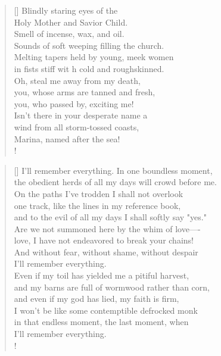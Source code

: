 \documentclass[]{article}
\begin{document}
\settowidth{\versewidth}{Blindly staring eyes of the        }
\begin{verse}[\versewidth]
Blindly staring eyes of the\\
Holy Mother and Savior Child.\\
Smell of incense, wax, and oil.\\
Sounds of soft weeping filling the church.\\
Melting tapers held by young, meek women\\
in fists stiff wit h cold and roughskinned.\\
Oh, steal me away from my death,\\
you, whose arms are tanned and fresh,\\
you, who passed by, exciting me!\\
Isn't there in your desperate name a\\
wind from all storm-tossed coasts,\\
Marina, named after the sea!\\!
\end{verse}
\newpage

\vspace*{0.05\textheight}
\settowidth{\versewidth}{I'll remember everything. In one boundless moment,    }
\begin{verse}[\versewidth]
I'll remember everything. In one boundless moment,\\
the obedient herds of all my days will crowd before me.\\
On the paths I've trodden I shall not overlook\\
one track, like the lines in my reference book,\\
and to the evil of all my days I shall softly say "yes."\\
Are we not summoned here by the whim of love—- \\
love, I have not endeavored to break your chains!\\
And without fear, without shame, without despair\\
I'll remember everything.\\
Even if my toil has yielded me a pitiful harvest,\\
and my barns are full of wormwood rather than corn,\\
and even if my god has lied, my faith is firm,\\
I won't be like some contemptible defrocked monk\\
in that endless moment, the last moment, when\\
I'll remember everything.\\!
\end{verse}
\bigskip \bigskip
\end{document}
